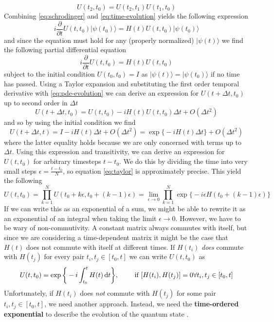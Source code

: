 \begin{equation}
	U(t_2,t_0) = U(t_2,t_1)U(t_1,t_0)
\end{equation}
Combining \eqref{eq:schrodinger} and \eqref{eq:time-evolution}  yields the following expression
\begin{equation}
	i \frac{\partial }{\partial t} U(t,t_0)|\psi(t_0)\rangle = H(t)U(t,t_0) |\psi(t_0)\rangle
\end{equation}
and since the equation must hold for any (properly normalized) $|\psi(t)\rangle$ we find the following partial differential equation
\begin{equation}
	i \frac{\partial }{\partial t} U(t,t_0) = H(t)U(t,t_0)
	\label{eq:pde-evolution}
\end{equation}
subject to the initial condition $U(t_0,t_0) = I$ as $|\psi(t)\rangle = |\psi(t_0)\rangle$ if no time has passed.
Using a Taylor expansion and substituting the first order temporal derivative with \eqref{eq:pde-evolution} we can derive an expression for $U(t+\Delta t, t_0)$ up to second order in $\Delta t$
\begin{equation}
	U(t + \Delta t, t_0)= U(t,t_0) - i H(t)U(t,t_0)\Delta t + O(\Delta t^2)
\end{equation}
and so by using the initial condition we find
\begin{equation}
	U(t + \Delta t, t)= I - i H(t)\Delta t + O(\Delta t^2) = \exp\bigg\{-iH(t)\Delta t\bigg\} + O(\Delta t^2)
	\label{eq:taylor}
\end{equation}
where the latter equality holds because we are only concerned with terms up to $\Delta t$. Using this expression and transitivity, we can derive an expression for $U(t,t_0)$ for arbitrary timesteps $t-t_0$. We do this by dividing the time into very small steps $\epsilon = \frac{t-t_0}{N}$, so equation \eqref{eq:taylor} is approximately precise. This yield the following
\begin{equation}
	U(t,t_0) = \prod_{k=1}^N U(t_0 + k\epsilon, t_0 + (k-1)\epsilon) = \lim_{\epsilon \to 0}\prod_{k=1}^N \exp\bigg\{-i\epsilon H(t_0 + (k-1) \epsilon)\bigg\}
\end{equation}
If we can write this as an exponential of a sum, we might be able to rewrite it as an exponential of an integral when taking the limit $\epsilon \to 0$. However, we have to be wary of non-commutivity. A constant matrix always commutes with itself, but since we are considering a time-dependent matrix it might be the case that $H(t)$ does not commute with itself at different times. If $H(t_i)$ \emph{does} commute with $H(t_j)$ for every pair $t_i,t_j \in [t_0,t]$ we can write $U(t,t_0)$ as 
\begin{equation}
	U(t,t_0) = \exp \bigg\{-i\int_{t_0}^tH(t)\mathop{}\!\mathrm{d} t\bigg\}, \qquad \text{ if } [H(t_i),H(t_j)] = 0 \forall t_i,t_j \in [t_0,t]
\end{equation}
Unfortunately, if $H(t_i)$ does \emph{not} commute with $H(t_j)$ for some pair $t_i,t_j \in [t_0,t]$, we need another approach. Instead, we need the \textbf{time-ordered exponential} to describe the evolution of the quantum state \cite{lecture-notes-evolution}. 

